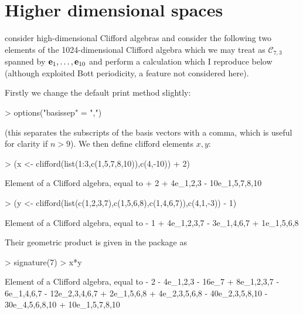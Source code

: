 \documentclass{article}
\begin{document}
\section{Higher dimensional spaces}

\cite{ablamowicz2012} consider high-dimensional Clifford algebras and
consider the following two elements of the 1024-dimensional Clifford
algebra which we may treat as ${\mathcal C}_{7,3}$ spanned by
${\bf e}_{1},\ldots,{\bf e}_{10}$ and perform a calculation which I reproduce
below (although \citeauthor{ablamowicz2012} exploited Bott
periodicity, a feature not considered here).

Firstly we change the default print method slightly:

\begin{Schunk}
\begin{Sinput}
> options("basissep" = ",")
\end{Sinput}
\end{Schunk}

(this separates the subscripts of the basis vectors with a comma,
which is useful for clarity if $n>9$).  We then define clifford
elements $x,y$:

\begin{Schunk}
\begin{Sinput}
> (x <- clifford(list(1:3,c(1,5,7,8,10)),c(4,-10)) + 2)
\end{Sinput}
\begin{Soutput}
Element of a Clifford algebra, equal to
+ 2 + 4e_1,2,3 - 10e_1,5,7,8,10
\end{Soutput}
\begin{Sinput}
> (y <- clifford(list(c(1,2,3,7),c(1,5,6,8),c(1,4,6,7)),c(4,1,-3)) - 1)
\end{Sinput}
\begin{Soutput}
Element of a Clifford algebra, equal to
- 1 + 4e_1,2,3,7 - 3e_1,4,6,7 + 1e_1,5,6,8
\end{Soutput}
\end{Schunk}

Their geometric product is given in the package as

\begin{Schunk}
\begin{Sinput}
> signature(7)
> x*y
\end{Sinput}
\begin{Soutput}
Element of a Clifford algebra, equal to
- 2 - 4e_1,2,3 - 16e_7 + 8e_1,2,3,7 - 6e_1,4,6,7 - 12e_2,3,4,6,7 + 2e_1,5,6,8 +
4e_2,3,5,6,8 - 40e_2,3,5,8,10 - 30e_4,5,6,8,10 + 10e_1,5,7,8,10
\end{Soutput}
\end{Schunk}
\end{document}
